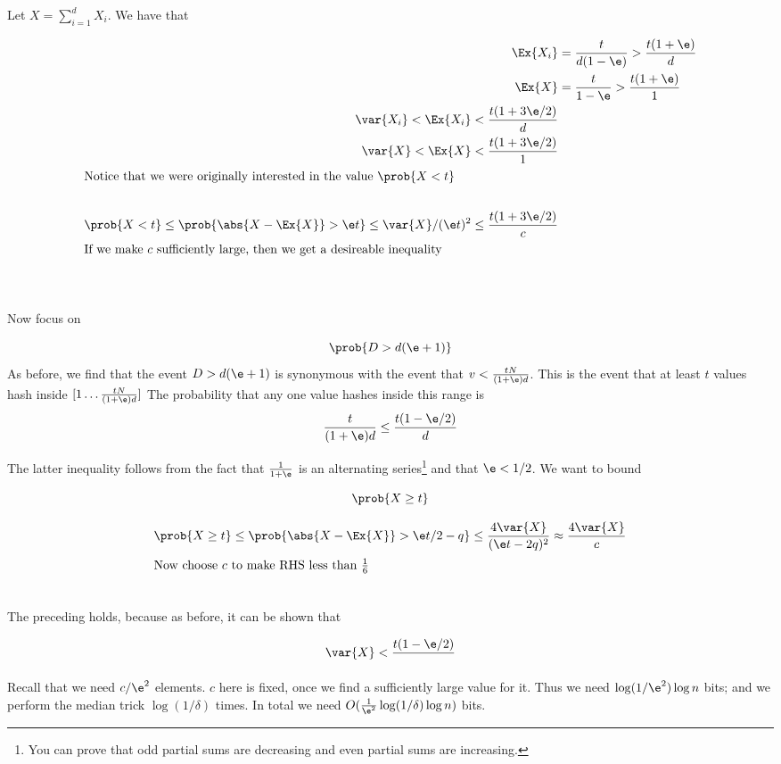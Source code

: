 \documentclass[../main.tex]{subfiles}
\begin{document}
\begin{outline}
    Let $X = \sum_{i=1}^{d}X_{i}$. We have that

    \begin{align*}
        \Ex{X_i} &= \frac{t}{d(1 -\e)} > \frac{t(1 + \e)}{d} \\
        \Ex{X} &= \frac{t}{1 -\e} > \frac{t(1 + \e)}{1} \\
        \var{X_i} < \Ex{X_i} < \frac{t(1 + 3\e/2)}{d} \\
        \var{X} < \Ex{X} < \frac{t(1 + 3\e/2)}{1} \\
        \intertext{Notice that we were originally interested in 
            the value $\prob{X < t}$} \\
        \prob{X < t} \leq \prob{\abs{X - \Ex{X}} > \e t} \leq \var{X}/(\e t)^2 \leq \frac{t(1 + 3\e/2)}{c}\\
        \intertext{If we make $c$ sufficiently large, then we get a desireable inequality} \\
    \end{align*}

    \breathe \\
    \1 Now focus on

    \[
        \prob{D > d(\e+ 1)}
    \]
    \1 As before, we find that the event $D > d(\e + 1)$ is synonymous with the event that $v < \frac{tN}{(1 + \e)d}$.
    \2 This is the event that at least $t$ values hash inside $[1 \dots \frac{tN}{(1 + \e)d}]$
    \1 The probability that any one value hashes inside this range is
    \[
        \frac{t}{(1 + \e)d} \leq \frac{t(1 -\e/2)}{d}
    \]

    The latter inequality follows from the fact that $\frac{1}{1 + \e}$ is an alternating series\footnote{You can prove that odd partial sums are decreasing and even partial sums are increasing.} and that $\e < 1/2$.
    We want to bound

    \[
        \prob{X \geq t} 
    \]

    \begin{align*}
        \prob{X \geq t} \leq \prob{\abs{X - \Ex{X}} > \e t/2 - q} \leq \frac{4 \var{X}}{(\e t - 2q)^2} \approx \frac{4 \var{X}}{c} \\
        \intertext{Now choose $c$ to make RHS less than $\frac{1}{6}$} \\
    \end{align*}

    \2 The preceding holds, because as before, it can be shown that

    \[
        \var{X} < \frac{t(1 -\e/2)}{}
    \]

    \1 Recall that we need $c/\e^2$ elements. $c$ here is fixed, once we find a sufficiently large value for it. Thus we need $\log(1/\e^2) \log n$ bits; and we perform the median trick $\log(1 /\delta)$ times.
    \2 In total we need $O(\frac{1}{\e^2} \log(1/\delta) \log n)$ bits.
\end{outline}
\end{document}
